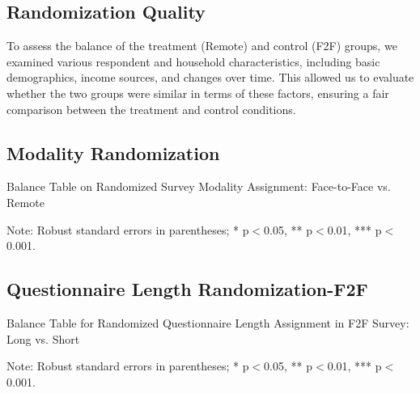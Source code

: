 \documentclass[11pt,harvard]{article}
\begin{document}
	\subsection{Randomization Quality}
	
	To assess the balance of the treatment (Remote) and control (F2F) groups, we examined various respondent and household characteristics, including basic demographics, income sources, and changes over time. This allowed us to evaluate whether the two groups were similar in terms of these factors, ensuring a fair comparison between the treatment and control conditions.
	
	\subsection{Modality Randomization}
	\begin{table}[htbp]
		\centering
		\begin{adjustbox}{max width=\textwidth}
			\begin{threeparttable}
				\caption{Balance Table on Randomized Survey Modality Assignment: Face-to-Face vs. Remote}
				\scriptsize
				 
				\label{tab:CAR_Listing_Demo_Balance_Modality}
				\begin{tablenotes}
					\item Note: Robust standard errors in parentheses; * p$<$0.05, ** p$<$0.01, *** p$<$0.001. 
				\end{tablenotes}
			\end{threeparttable}
		\end{adjustbox}
	\end{table}
	
	\pagebreak
	
	\subsection{Questionnaire Length Randomization-F2F}
	
	\begin{table}[htbp]
		\centering
		\begin{adjustbox}{max width=\textwidth}
			\begin{threeparttable}
				\caption{Balance Table for Randomized Questionnaire Length Assignment in F2F Survey: Long vs. Short}
				\scriptsize
				 
				\label{tab:CAR_Listing_Demo_Balance_F2F_Length}
				\begin{tablenotes}
					\item Note: Robust standard errors in parentheses; * p$<$0.05, ** p$<$0.01, *** p$<$0.001.
				\end{tablenotes}
			\end{threeparttable}
		\end{adjustbox}
	\end{table}
	
\end{document}
